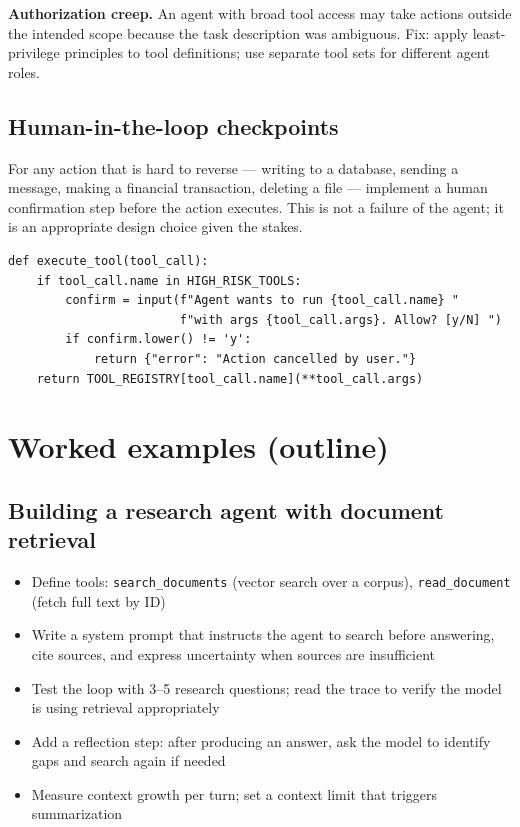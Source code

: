 \textbf{Authorization creep.} An agent with broad tool access may take actions outside the intended scope because the task description was ambiguous. Fix: apply least-privilege principles to tool definitions; use separate tool sets for different agent roles.

\subsection{Human-in-the-loop checkpoints}

For any action that is hard to reverse --- writing to a database, sending a message, making a financial transaction, deleting a file --- implement a human confirmation step before the action executes. This is not a failure of the agent; it is an appropriate design choice given the stakes.

\begin{verbatim}
def execute_tool(tool_call):
    if tool_call.name in HIGH_RISK_TOOLS:
        confirm = input(f"Agent wants to run {tool_call.name} "
                        f"with args {tool_call.args}. Allow? [y/N] ")
        if confirm.lower() != 'y':
            return {"error": "Action cancelled by user."}
    return TOOL_REGISTRY[tool_call.name](**tool_call.args)
\end{verbatim}


\section{Worked examples (outline)}

\subsection{Building a research agent with document retrieval}
\begin{itemize}[noitemsep,topsep=0pt]
  \item Define tools: \texttt{search\_documents} (vector search over a corpus), \texttt{read\_document} (fetch full text by ID)
  \item Write a system prompt that instructs the agent to search before answering, cite sources, and express uncertainty when sources are insufficient
  \item Test the loop with 3--5 research questions; read the trace to verify the model is using retrieval appropriately
  \item Add a reflection step: after producing an answer, ask the model to identify gaps and search again if needed
  \item Measure context growth per turn; set a context limit that triggers summarization
\end{itemize}

